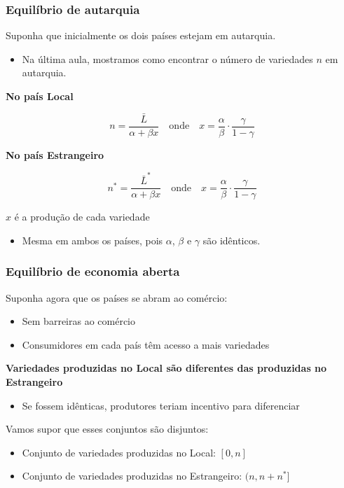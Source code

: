 \documentclass[a4paper,12pt]{article}[abntex2]
\begin{document}
\subsubsection{\textbf{Equilíbrio de autarquia}}
Suponha que inicialmente os dois países estejam em autarquia.\begin{itemize}
    \item Na última aula, mostramos como encontrar o número de variedades \(n\) em autarquia.
\end{itemize}

\textbf{No país Local}

\[
n = \frac{\bar{L}}{\alpha + \beta x}
\quad \text{onde} \quad
x = \frac{\alpha}{\beta} \cdot \frac{\gamma}{1 - \gamma}
\]

\textbf{No país Estrangeiro}

\[
n^* = \frac{\bar{L}^*}{\alpha + \beta x}
\quad \text{onde} \quad
x = \frac{\alpha}{\beta} \cdot \frac{\gamma}{1 - \gamma}
\]

\textbf{\(x\)} é a produção de cada variedade\begin{itemize}
    \item Mesma em ambos os países, pois \(\alpha\), \(\beta\) e \(\gamma\) são idênticos.
\end{itemize}

\subsubsection{\textbf{Equilíbrio de economia aberta}}
Suponha agora que os países se abram ao comércio:

\begin{itemize}
    \item Sem barreiras ao comércio
    \item Consumidores em cada país têm acesso a mais variedades
\end{itemize}

\textbf{Variedades produzidas no Local são diferentes das produzidas no Estrangeiro}

\begin{itemize}
    \item Se fossem idênticas, produtores teriam incentivo para diferenciar
\end{itemize}

Vamos supor que esses conjuntos são disjuntos:

\begin{itemize}
    \item Conjunto de variedades produzidas no Local: \([0, n]\)
    \item Conjunto de variedades produzidas no Estrangeiro: \((n, n + n^*]\)
\end{itemize}
\end{document}
